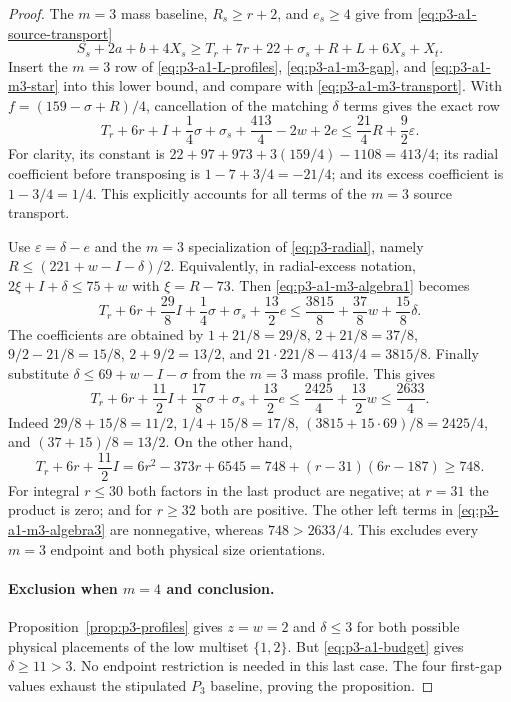 \documentclass[11pt,letterpaper]{article}
\theoremstyle{definition}\newtheorem{definition}[theorem]{Definition}
\begin{document}
\begin{proof}
The $m=3$ mass baseline, $R_s\ge r+2$, and $e_s\ge4$ give from
\eqref{eq:p3-a1-source-transport}
\begin{equation}\label{eq:p3-a1-m3-source}
 S_s+2a+b+4X_s
 \ge T_r+7r+22+\sigma_s+R+L+6X_s+X_t.
\end{equation}
Insert the $m=3$ row of \eqref{eq:p3-a1-L-profiles},
\eqref{eq:p3-a1-m3-gap}, and \eqref{eq:p3-a1-m3-star} into this
lower bound, and compare with \eqref{eq:p3-a1-m3-transport}. With
$f=(159-\sigma+R)/4$, cancellation of the matching $\delta$ terms
gives the exact row
\begin{equation}\label{eq:p3-a1-m3-algebra1}
 T_r+6r+I+\frac14\sigma+\sigma_s+\frac{413}{4}-2w+2e
 \le\frac{21}{4}R+\frac92\varepsilon.
\end{equation}
For clarity, its constant is
$22+97+973+3(159/4)-1108=413/4$; its radial coefficient before
transposing is $1-7+3/4=-21/4$; and its excess coefficient is
$1-3/4=1/4$. This explicitly accounts for all terms of the
$m=3$ source transport.

Use $\varepsilon=\delta-e$ and the $m=3$ specialization of
\eqref{eq:p3-radial}, namely $R\le(221+w-I-\delta)/2$.
Equivalently, in radial-excess notation, $2\xi+I+\delta\le75+w$
with $\xi=R-73$. Then \eqref{eq:p3-a1-m3-algebra1} becomes
\begin{equation}\label{eq:p3-a1-m3-algebra2}
 T_r+6r+\frac{29}{8}I+\frac14\sigma+\sigma_s+\frac{13}{2}e
 \le\frac{3815}{8}+\frac{37}{8}w+\frac{15}{8}\delta.
\end{equation}
The coefficients are obtained by $1+21/8=29/8$,
$2+21/8=37/8$, $9/2-21/8=15/8$, $2+9/2=13/2$, and
$21\cdot221/8-413/4=3815/8$.
Finally substitute $\delta\le69+w-I-\sigma$ from the $m=3$ mass
profile. This gives
\begin{equation}\label{eq:p3-a1-m3-algebra3}
 T_r+6r+\frac{11}{2}I+\frac{17}{8}\sigma+\sigma_s+\frac{13}{2}e
 \le\frac{2425}{4}+\frac{13}{2}w\le\frac{2633}{4}.
\end{equation}
Indeed $29/8+15/8=11/2$, $1/4+15/8=17/8$,
$(3815+15\cdot69)/8=2425/4$, and $(37+15)/8=13/2$.
On the other hand,
\begin{equation}\label{eq:p3-a1-m3-quadratic}
 T_r+6r+\frac{11}{2}I
 =6r^2-373r+6545
 =748+(r-31)(6r-187)\ge748.
\end{equation}
For integral $r\le30$ both factors in the last product are negative;
at $r=31$ the product is zero; and for $r\ge32$ both are positive.
The other left terms in \eqref{eq:p3-a1-m3-algebra3} are
nonnegative, whereas $748>2633/4$. This excludes every $m=3$
endpoint and both physical size orientations.

\paragraph{Exclusion when $m=4$ and conclusion.}
Proposition~\ref{prop:p3-profiles} gives $z=w=2$ and $\delta\le3$
for both possible physical placements of the low multiset $\{1,2\}$.
But \eqref{eq:p3-a1-budget} gives $\delta\ge11>3$. No endpoint
restriction is needed in this last case. The four first-gap values
exhaust the stipulated $P_3$ baseline, proving the proposition.
\end{proof}
\end{document}
